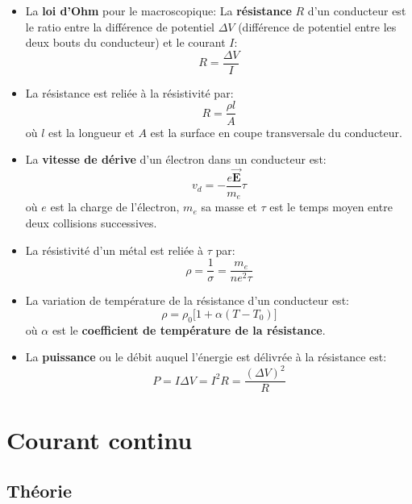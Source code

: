 \documentclass[a4paper]{article}
\begin{document}
\begin{itemize}
    \item La \textbf{loi d'Ohm} pour le macroscopique: La \textbf{résistance} $ R $ d'un conducteur est le ratio entre la différence de 
potentiel $ \Delta V $ (différence de potentiel entre les deux bouts du conducteur) et le courant $ I $: \[ R = \frac{\Delta V}{I} \]
    \item La résistance est reliée à la résistivité par: \[ R = \frac{\rho l}{A} \]
où $ l $ est la longueur et $ A $ est la surface en coupe transversale du conducteur.
    \item La \textbf{vitesse de dérive} d'un électron dans un conducteur est: \[ v_d = - \frac{e \vec{\textbf{E}}}{m_e} \tau \]
où $ e $ est la charge de l'électron, $ m_e $ sa masse et $ \tau $ est le temps moyen entre deux collisions successives.
    \item La résistivité d'un métal est reliée à $ \tau $ par: \[ \rho = \frac{1}{\sigma} = \frac{m_e}{n e^2 \tau} \]
    \item La variation de température de la résistance d'un conducteur est: 
\[ \rho = \rho_0 \Big[ 1 + \alpha (T - T_0) \Big] \]
où $ \alpha $ est le \textbf{coefficient de température de la résistance}.
    \item La \textbf{puissance} ou le débit auquel l'énergie est délivrée à la résistance est: 
\[ P = I \Delta V = I^2 R = \frac{( \Delta V )^2}{R} \]
\end{itemize}

















\section{Courant continu}











\subsection{Théorie}
\end{document}
